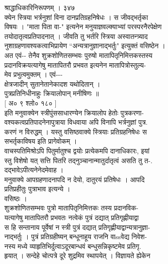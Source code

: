 \documentclass[11pt, openany]{book}
\begin{document}
{{{{{{{{{{{{{{{{{{{{{{{{{{{{{{{{{{{{{{{{{{{{{{{{{{{{{{{{{{{{{{{{{{{{{{{{{{{{{{{{{{{{{{{{{{{{{{{{{{{{{{{{{{{{{{{{{{{{{{{{{{{{{{{{{{{{ श्राद्धाधिकारिनिरूपणम् । ३४७\\
क्येन स्त्रिया भर्त्रनुशां विना दानप्रतिग्रहनिषेधः । स जीवद्भर्तृका\\
विषयः । "माता पिता वा-" इत्यनेन मनुयाज्ञवल्क्याभ्यां परस्परनैरपेक्षेण\\
तयोदातृत्वप्रतिपादनात् । जीवति तु भर्तरि स्त्रिया अस्वातन्त्र्याद\\
नुशाग्रहणावश्यकत्वाभिप्रायेण ``अन्यत्रानुज्ञानाद्भर्तुः" इत्युक्तं
वसिष्ठेन ।\\
अत एवं-\/- तेनैव शुक्रशोणितसम्भवः पुरुषो मातापितृनिमित्तकस्तस्य\\
प्रदानविक्रयत्यागेषु मातापितरौ प्रभवत इत्यनेन मातापित्रोस्तुल्य-\\
मेव प्रभुत्वमुक्तम् । एवं-\/-\/-\\
क्षेत्रजादीन् सुतानेतानेकादश यथोदितान् ।\\
पुत्रप्रतिनिधीनाहुः क्रियालोपान् मनीषिणः ॥\\
{[} अ० ९ श्लो० १८० {]}\\
इति मनुवाक्येन स्त्रीपुंससाधारण्येन क्रियालोप हेतोः पुत्रकरणा-\\
वश्यकत्वप्रतिपादनेनापुत्राया विधवाया अपि विनापि भर्त्रनुज्ञां पुत्र.\\
करणं न विरुद्धम् । यस्तु वसिष्ठवाक्ये स्त्रियाः प्रतिग्रहनिषेधः स\\
सभर्तृकाविषय इति प्रागेवोकम् ।\\
वाचस्पतिमिश्रोऽपि पितुर्मातुश्च द्वयोः प्रत्येकमपि दानाधिकारः, इयां\\
स्तु विशेषो यत् सत्ति पितरि तद्नुञ्चानान्मातुर्दातृत्वं असति तु त-.\\
दद्भावेऽपीत्यनेनेदमेवाह ।\\
मनुवाक्ये आपग्रहणादनापदि न देयो, दातुरयं प्रतिषेधः । आपदि\\
प्रतिप्रहीतुः पुत्राभाव इत्यन्ये ।\\
वसिष्ठः ।\\
शुक्रशोणितसम्भवः पुत्रो मातापितृनिमित्तकः तस्य प्रदानविक-\\
यत्यागेषु मातापितरौ प्रभवतः नत्वेकं पुत्रं दद्यात् प्रतिगृह्णीयाद्वा\\
स हि सन्तानाय पूर्वेषां न स्त्री पुत्रं दद्यात्
प्रतिगृह्णीयाद्वान्यत्रानुज्ञा-\\
नाद्भर्तुः । पुत्रं प्रतिग्रहीष्यन् बन्धूनाहूय राजनि वाssवेद्य निवेश-\\
नस्य मध्ये व्याहृतिभिर्दुत्वाऽदूरबान्धवं बन्धुसन्निकृष्टमेव प्रतिगृ.\\
हृयात् । सन्देहे चोत्पत्रे दूरे शुद्रमिव स्थापयेत् । विज्ञायते ह्येकेन\\
}}}}}}}}}}}}}}}}}}}}}}}}}}}}}}}}}}}}}}}}}}}}}}}}}}}}}}}}}}}}}}}}}}}}}}}}}}}}}}}}}}}}}}}}}}}}}}}}}}}}}}}}}}}}}}}}}}}}}}}}}}}}}}}}}}}}
\end{document}
